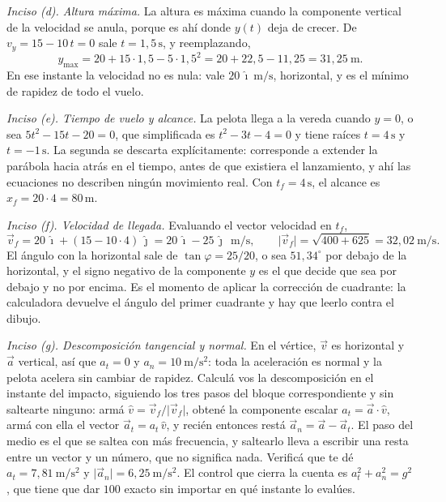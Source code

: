 \documentclass[11pt,openany]{book}
\begin{document}
\begin{ejemplo}[completo]
\medskip
\textit{Inciso (d). Altura máxima.} La altura es máxima cuando la componente vertical de la velocidad se anula, porque es ahí donde $y(t)$ deja de crecer. De $v_y = 15 - 10\,t = 0$ sale $t = 1{,}5\,\mathrm{s}$, y reemplazando,
\[
y_{\max} = 20 + 15\cdot 1{,}5 - 5\cdot 1{,}5^2 = 20 + 22{,}5 - 11{,}25 = 31{,}25\ \mathrm{m}.
\]
En ese instante la velocidad no es nula: vale $20\,\hat\imath\ \mathrm{m/s}$, horizontal, y es el mínimo de rapidez de todo el vuelo.

\medskip
\textit{Inciso (e). Tiempo de vuelo y alcance.} La pelota llega a la vereda cuando $y = 0$, o sea $5t^2 - 15t - 20 = 0$, que simplificada es $t^2 - 3t - 4 = 0$ y tiene raíces $t = 4\,\mathrm{s}$ y $t = -1\,\mathrm{s}$. La segunda se descarta explícitamente: corresponde a extender la parábola hacia atrás en el tiempo, antes de que existiera el lanzamiento, y ahí las ecuaciones no describen ningún movimiento real. Con $t_f = 4\,\mathrm{s}$, el alcance es $x_f = 20\cdot 4 = 80\,\mathrm{m}$.

\medskip
\textit{Inciso (f). Velocidad de llegada.} Evaluando el vector velocidad en $t_f$,
\[
\vec v_f = 20\,\hat\imath + (15 - 10\cdot 4)\,\hat\jmath = 20\,\hat\imath - 25\,\hat\jmath\ \ \mathrm{m/s},
\qquad
\lvert\vec v_f\rvert = \sqrt{400+625} = 32{,}02\ \mathrm{m/s}.
\]
El ángulo con la horizontal sale de $\tan\varphi = 25/20$, o sea $51{,}34^\circ$ por debajo de la horizontal, y el signo negativo de la componente $y$ es el que decide que sea por debajo y no por encima. Es el momento de aplicar la corrección de cuadrante: la calculadora devuelve el ángulo del primer cuadrante y hay que leerlo contra el dibujo.

\medskip
\textit{Inciso (g). Descomposición tangencial y normal.} En el vértice, $\vec v$ es horizontal y $\vec a$ vertical, así que $a_t = 0$ y $a_n = 10\ \mathrm{m/s^2}$: toda la aceleración es normal y la pelota acelera sin cambiar de rapidez. Calculá vos la descomposición en el instante del impacto, siguiendo los tres pasos del bloque correspondiente y sin saltearte ninguno: armá $\hat v = \vec v_f/\lvert\vec v_f\rvert$, obtené la componente escalar $a_t = \vec a\cdot\hat v$, armá con ella el vector $\vec a_t = a_t\,\hat v$, y recién entonces restá $\vec a_n = \vec a - \vec a_t$. El paso del medio es el que se saltea con más frecuencia, y saltearlo lleva a escribir una resta entre un vector y un número, que no significa nada. Verificá que te dé $a_t = 7{,}81\ \mathrm{m/s^2}$ y $\lvert\vec a_n\rvert = 6{,}25\ \mathrm{m/s^2}$. El control que cierra la cuenta es $a_t^2 + a_n^2 = g^2$, que tiene que dar $100$ exacto sin importar en qué instante lo evalúes.


\end{ejemplo}
\end{document}
